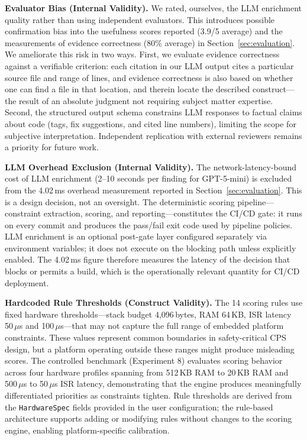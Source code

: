 \textbf{Evaluator Bias (Internal Validity).}
We rated, ourselves, the LLM enrichment quality rather than using independent evaluators. This introduces possible confirmation bias into the usefulness scores reported (3.9/5 average) and the measurements of evidence correctness (80\% average) in Section~\ref{sec:evaluation}. We ameliorate this risk in two ways. First, we evaluate evidence correctness against a verifiable criterion: each citation in our LLM output cites a particular source file and range of lines, and evidence correctness is also based on whether one can find a file in that location, and therein locate the described construct---the result of an absolute judgment not requiring subject matter expertise. Second, the structured output schema constrains LLM responses to factual claims about code (tags, fix suggestions, and cited line numbers), limiting the scope for subjective interpretation. Independent replication with external reviewers remains a priority for future work.

\textbf{LLM Overhead Exclusion (Internal Validity).}
The network-latency-bound cost of LLM enrichment (2--10 seconds per finding for GPT-5-mini) is excluded from the 4.02\,ms overhead measurement reported in Section~\ref{sec:evaluation}. This is a design decision, not an oversight. The deterministic scoring pipeline---constraint extraction, scoring, and reporting---constitutes the CI/CD gate: it runs on every commit and produces the pass/fail exit code used by pipeline policies. LLM enrichment is an optional post-gate layer configured separately via environment variables; it does not execute on the blocking path unless explicitly enabled. The 4.02\,ms figure therefore measures the latency of the decision that blocks or permits a build, which is the operationally relevant quantity for CI/CD deployment.

\textbf{Hardcoded Rule Thresholds (Construct Validity).}
The 14 scoring rules use fixed hardware thresholds---stack budget 4{,}096\,bytes, RAM 64\,KB, ISR latency 50\,$\mu$s and 100\,$\mu$s---that may not capture the full range of embedded platform constraints. These values represent common boundaries in safety-critical CPS design, but a platform operating outside these ranges might produce misleading scores. The controlled benchmark (Experiment 8) evaluates scoring behavior across four hardware profiles spanning from 512\,KB RAM to 20\,KB RAM and 500\,$\mu$s to 50\,$\mu$s ISR latency, demonstrating that the engine produces meaningfully differentiated priorities as constraints tighten. Rule thresholds are derived from the \texttt{HardwareSpec} fields provided in the user configuration; the rule-based architecture supports adding or modifying rules without changes to the scoring engine, enabling platform-specific calibration.

